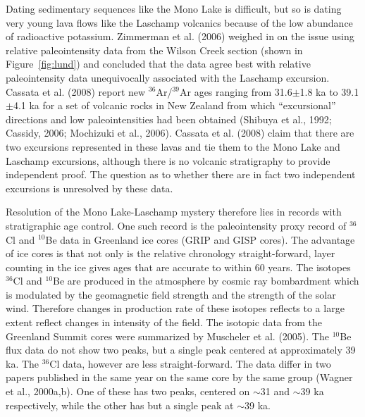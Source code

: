  Dating sedimentary sequences like the Mono Lake is difficult, but so is dating very young lava flows like the Laschamp volcanics because of the low abundance of radioactive potassium. 
  Zimmerman et al. (2006) weighed in on the issue using relative paleointensity data from the Wilson Creek section \nocite{zimmerman06} (shown in Figure~\ref{fig:lund}) and concluded that the data agree best with relative paleointensity data unequivocally associated with the Laschamp excursion.   
  Cassata et al. (2008) \nocite{cassata08} report new $^{36}$Ar/$^{39}$Ar ages ranging from 31.6$\pm$1.8 ka to 39.1$\pm$4.1 ka  for  a set  of volcanic rocks in New Zealand  from which ``excursional'' directions and low paleointensities  had been obtained
   (Shibuya et al., 1992; 
  Cassidy, 2006; 
  Mochizuki et al., 2006). \nocite{shibuya92,cassidy06,mochizuki06}   Cassata et al. (2008) claim that there are two excursions represented in these lavas and tie them to the Mono Lake and Laschamp excursions, although there is no volcanic stratigraphy to provide independent proof.  The question as to whether there are in fact two independent excursions is unresolved by these data.  

Resolution of the Mono Lake-Laschamp mystery therefore lies in records with stratigraphic age control.  One such record is the paleointensity proxy record of $^{36}$Cl and $^{10}$Be data in Greenland ice cores (GRIP and GISP cores).    The advantage of ice cores is that not only is the relative chronology straight-forward, layer counting in the ice gives ages that are accurate to within 60 years.  The isotopes $^{36}$Cl and $^{10}$Be are produced in the atmosphere by cosmic ray bombardment which is modulated by the geomagnetic field strength and the strength of the solar wind.  Therefore changes in production rate of these isotopes reflects to a large extent reflect changes in intensity of the field.   The isotopic  data from the Greenland Summit cores were summarized by 
Muscheler et al. (2005). \nocite{muscheler05}  The $^{10}$Be flux data do not show two peaks, but a single peak centered at approximately 39 ka.   The $^{36}$Cl data, however are less straight-forward.  The data differ in two papers published in the same year on the same core by the same group
 (Wagner et al., 2000a,b). \nocite{wagner00,wagner00b}  One of these has two peaks, centered on $\sim$31 and $\sim$39 ka respectively, while the other has but a single peak at $\sim$39 ka.   

